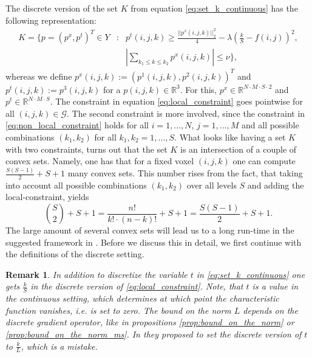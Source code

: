 \documentclass{scrreprt}
\newtheorem{remark}[theorem]{Remark}
\begin{document}
        The discrete version of the set $K$ from equation \ref{eq:set_k_continuous} has the following representation:
            \begin{eqnarray}
                K = \{ p = (p^{x}, p^{t})^{T} \in Y &:& p^{t}(i,j,k) \ge \frac{||p^{x}(i,j,k)||_{2}^{2}}{4} - \lambda(\frac{k}{S} - f(i,j))^{2}, \label{eq:local_constraint} \\
                &&\left| \sum_{k_{1} \le k \le k_{2}} p^{x}(i,j,k) \right| \le \nu \}, \label{eq:non_local_constraint}
            \end{eqnarray}
        whereas we define $p^{x}(i,j,k) := (p^{1}(i,j,k), p^{2}(i,j,k))^{T}$ and $p^{t}(i,j,k) := p^{3}(i,j,k)$ for a $p(i,j,k) \in \mathbb{R}^{3}$. For this, $p^{x} \in \mathbb{R}^{N \cdot M \cdot S \cdot 2}$ and $p^{t} \in \mathbb{R}^{N \cdot M \cdot S}$. The constraint in equation \ref{eq:local_constraint} goes pointwise for all $(i, j, k) \in \mathcal{G}$. The second constraint is more involved, since the constraint in \ref{eq:non_local_constraint} holds for all $i = 1, ..., N$, $j = 1, ..., M$ and all possible combinations $(k_{1}, k_{2})$ for all $k_{1}, k_{2} = 1, ..., S$. What looks like having a set $K$ with two constraints, turns out that the set $K$ is an intersection of a couple of convex sets. Namely, one has that for a fixed voxel $(i, j, k)$ one can compute $\frac{S (S - 1)}{2} + S + 1$ many convex sets. This number rises from the fact, that taking into account all possible combinations $(k_{1}, k_{2})$ over all levels $S$ and adding the local-constraint, yields
            $$
                \binom{S}{2} + S + 1 = \frac{n!}{k! \cdot (n-k)!} + S + 1 = \frac{S(S-1)}{2} + S + 1.
            $$
        The large amount of several convex sets will lead us to a long run-time in the suggested framework in \cite{Pock-et-al-iccv09}. Before we discuss this in detail, we first continue with the definitions of the discrete setting.

        \begin{remark}
            In addition to discretize the variable $t$ in \ref{eq:set_k_continuous} one gets $\frac{k}{S}$ in the discrete version of \ref{eq:local_constraint}. Note, that $t$ is a value in the continuous setting, which determines at which point the characteristic function vanishes, i.e. is set to zero. The bound on the norm $L$ depends on the discrete gradient operator, like in propositions \ref{prop:bound_on_the_norm} or \ref{prop:bound_on_the_norm_ms}. In \cite{Pock-et-al-iccv09} they proposed to set the discrete version of $t$ to $\frac{k}{L}$, which is a mistake.
        \end{remark}
\end{document}
